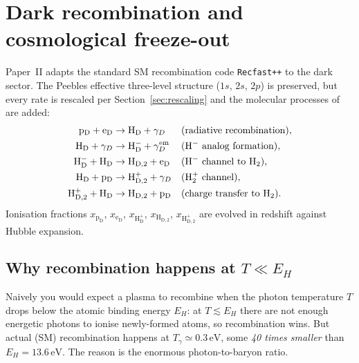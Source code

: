 \documentclass[12pt]{article}
\newcommand{\HD}{\mathrm{H_D}}
\newcommand{\HDp}{\mathrm{H_D^+}}
\newcommand{\HDm}{\mathrm{H_D^-}}
\newcommand{\HDtwo}{\mathrm{H_{D,2}}}
\newcommand{\HDtwop}{\mathrm{H_{D,2}^+}}
\newcommand{\pD}{\mathrm{p_D}}
\newcommand{\eD}{\mathrm{e_D}}
\newcommand{\gD}{\gamma_D}
\newcommand{\eV}{\,\mathrm{eV}}
\begin{document}
\section{Dark recombination and cosmological freeze-out}
\label{sec:recomb}

Paper~II adapts the standard SM recombination code
\texttt{Recfast++} \citep{Peebles1968, Seager1999} to the dark
sector.  The Peebles effective three-level structure ($1s$, $2s$,
$2p$) is preserved, but every rate is rescaled per
Section~\ref{sec:rescaling} and the molecular processes of
\citet{GalliPalla1998} are added:
%
\begin{align}
  \pD + \eD &\rightarrow \HD + \gD
     &&\text{(radiative recombination)},\\
  \HD + \gD &\rightarrow \HDm + \gD^{\rm em}
     &&\text{(H$^-$ analog formation)},\\
  \HDm + \HD &\rightarrow \HDtwo + \eD
     &&\text{(H$^-$ channel to H$_2$)},\\
  \HD + \pD &\rightarrow \HDtwop + \gD
     &&\text{(H$_2^+$ channel)},\\
  \HDtwop + \HD &\rightarrow \HDtwo + \pD
     &&\text{(charge transfer to H$_2$)}.
\end{align}
%
Ionisation fractions $x_{\pD}$, $x_{\eD}$, $x_{\HDp}$, $x_{\HDtwo}$,
$x_{\HDtwop}$ are evolved in redshift against Hubble expansion.

\subsection{Why recombination happens at $T\ll E_H$}
\label{sec:saha_factor}

Naively you would expect a plasma to recombine when the photon
temperature $T$ drops below the atomic binding energy $E_H$: at
$T\lesssim E_H$ there are not enough energetic photons to ionise
newly-formed atoms, so recombination wins.  But actual (SM)
recombination happens at $T_\gamma \simeq 0.3\eV$, some \emph{40 times
smaller} than $E_H = 13.6\eV$.  The reason is the enormous
photon-to-baryon ratio.
\end{document}
